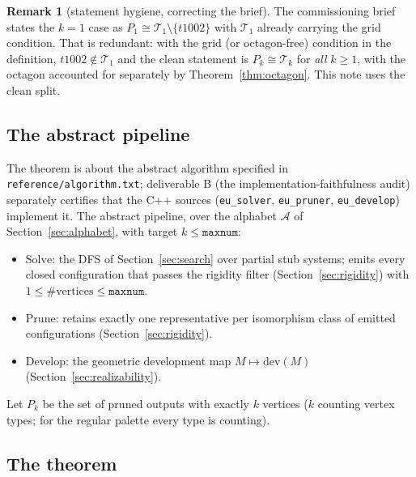 \documentclass[11pt]{article}
\theoremstyle{definition}
\newtheorem{remark}[theorem]{Remark}
\newcommand{\dev}{\mathrm{dev}}
\newcommand{\A}{\mathcal{A}}
\newcommand{\T}{\mathcal{T}}
\begin{document}
\begin{remark}[statement hygiene, correcting the brief]\label{rem:hygiene}
The commissioning brief states the $k=1$ case as $P_1 \cong \T_1 \setminus \{t1002\}$
with $\T_1$ already carrying the grid condition. That is redundant: with the grid (or
octagon-free) condition in the definition, $t1002 \notin \T_1$ and the clean statement is
$P_k \cong \T_k$ for \emph{all} $k \ge 1$, with the octagon accounted for separately by
Theorem~\ref{thm:octagon}. This note uses the clean split.
\end{remark}

\subsection{The abstract pipeline}

The theorem is about the abstract algorithm specified in
\texttt{reference/algorithm.txt}; deliverable B (the implementation-faithfulness audit)
separately certifies that the C++ sources (\texttt{eu\_solver}, \texttt{eu\_pruner},
\texttt{eu\_develop}) implement it. The abstract pipeline, over the alphabet $\A$ of
Section~\ref{sec:alphabet}, with target $k \le \texttt{maxnum}$:

\begin{itemize}
\item $\mathrm{Solve}$: the DFS of Section~\ref{sec:search} over partial stub systems;
  emits every closed configuration that passes the rigidity filter
  (Section~\ref{sec:rigidity}) with $1 \le \#\text{vertices} \le \texttt{maxnum}$.
\item $\mathrm{Prune}$: retains exactly one representative per isomorphism class of
  emitted configurations (Section~\ref{sec:rigidity}).
\item $\mathrm{Develop}$: the geometric development map $M \mapsto \dev(M)$
  (Section~\ref{sec:realizability}).
\end{itemize}

Let $P_k$ be the set of pruned outputs with exactly $k$ vertices ($k$ counting vertex
types; for the regular palette every type is counting).

\subsection{The theorem}
\end{document}
